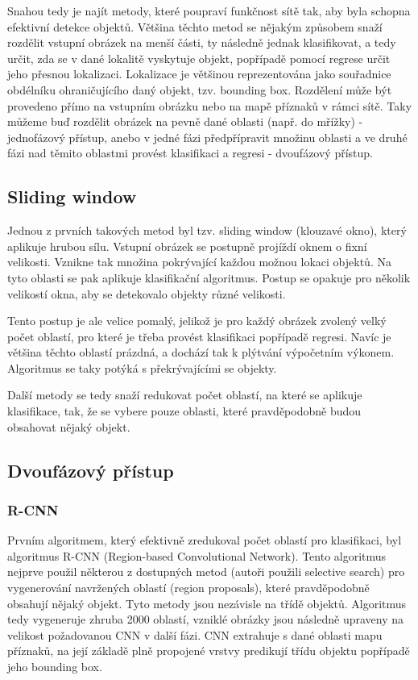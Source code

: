 Snahou tedy je najít metody, které poupraví funkčnost sítě tak, aby byla
schopna efektivní detekce objektů. Většina těchto metod se nějakým způsobem
snaží rozdělit vstupní obrázek na menší části, ty následně jednak klasifikovat,
a tedy určit, zda se v dané lokalitě vyskytuje objekt, popřípadě pomocí regrese
určit jeho přesnou lokalizaci. Lokalizace je většinou reprezentována jako
souřadnice obdélníku ohraničujícího daný objekt, tzv. bounding box. Rozdělení
může být provedeno přímo na vstupním obrázku nebo na mapě příznaků v rámci
sítě. Taky můžeme buď rozdělit obrázek na pevně dané oblasti (např. do mřížky)
- jednofázový přístup, anebo v jedné fázi předpřípravit množinu oblasti a ve
druhé fázi nad těmito oblastmi provést klasifikaci a regresi - dvoufázový
přístup.

\subsection{Sliding window}

Jednou z prvních takových metod byl tzv. sliding window (klouzavé okno), který
aplikuje hrubou sílu. Vstupní obrázek se postupně projíždí oknem o fixní
velikosti. Vznikne tak množina pokrývající každou možnou lokaci objektů. Na
tyto oblasti se pak aplikuje klasifikační algoritmus. Postup se opakuje pro
několik velikostí okna, aby se detekovalo objekty různé velikosti.

Tento postup je ale velice pomalý, jelikož je pro každý obrázek zvolený velký
počet oblastí, pro které je třeba provést klasifikaci popřípadě regresi. Navíc
je většina těchto oblastí prázdná, a dochází tak k plýtvání výpočetním výkonem.
Algoritmus se taky potýká s překrývajícími se objekty.

Další metody se tedy snaží redukovat počet oblastí, na které se aplikuje
klasifikace, tak, že se vybere pouze oblasti, které pravděpodobně budou
obsahovat nějaký objekt.

\subsection{Dvoufázový přístup}

\subsubsection{R-CNN}
Prvním algoritmem, který efektivně zredukoval počet oblastí pro klasifikaci,
byl algoritmus R-CNN (Region-based Convolutional Network). \cite{r-cnn} Tento
algoritmus nejprve použil některou z dostupných metod (autoři použili selective
search) pro vygenerování navržených oblastí (region proposals), které
pravděpodobně obsahují nějaký objekt. Tyto metody jsou nezávisle na třídě
objektů. Algoritmus tedy vygeneruje zhruba 2000 oblastí, vzniklé obrázky jsou
následně upraveny na velikost požadovanou CNN v další fázi. CNN extrahuje s
dané oblasti mapu příznaků, na její základě plně propojené vrstvy predikují
třídu objektu popřípadě jeho bounding box.

